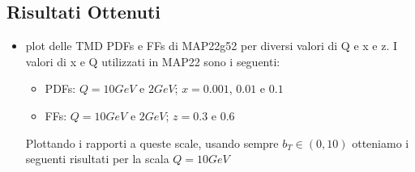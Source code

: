 \documentclass{article}
\begin{document}
\subsection{Risultati Ottenuti}
\begin{itemize}
    \item plot delle TMD PDFs e FFs di MAP22g52 per diversi valori di Q e x e z. I valori di x e Q utilizzati in MAP22 sono i seguenti:
    \begin{itemize}
        \item PDFs: $Q = 10 GeV$ e $2 GeV$; $x = 0.001$, $0.01$ e $0.1$
        \item FFs: $Q = 10 GeV$ e $2 GeV$; $z = 0.3$ e $0.6$
    \end{itemize}

    Plottando i rapporti a queste scale, usando sempre $b_T \in (0, 10)$ otteniamo i seguenti risultati per la scala $Q = 10 GeV$


\end{itemize}
\end{document}
